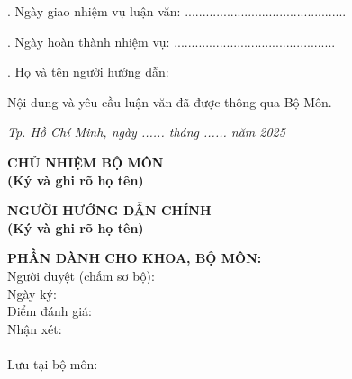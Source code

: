 \vspace{0.4cm}
. Ngày giao nhiệm vụ luận văn: .............................................. 

\vspace{0.2cm}
. Ngày hoàn thành nhiệm vụ: ..............................................

\vspace{0.2cm}
. Họ và tên người hướng dẫn: \TENCANBO

\vspace{0.4cm}
\noindent Nội dung và yêu cầu luận văn đã được thông qua Bộ Môn.

\vspace{0.3cm}
\noindent \hfill \textit{Tp. Hồ Chí Minh, ngày ...... tháng ...... năm 2025}

\vspace{0.5cm}
\begin{center}
\begin{minipage}[t]{0.48\textwidth}
\centering
\textbf{CHỦ NHIỆM BỘ MÔN} \\[2.5cm]
\textbf{\small (Ký và ghi rõ họ tên)}
\end{minipage}
\hfill
\begin{minipage}[t]{0.48\textwidth}
\centering
\textbf{NGƯỜI HƯỚNG DẪN CHÍNH} \\[2.5cm]
\textbf{\small (Ký và ghi rõ họ tên)}
\end{minipage}
\end{center}


\vspace{0.3cm}
\noindent
\begin{minipage}[t]{\textwidth}
\textbf{PHẦN DÀNH CHO KHOA, BỘ MÔN:}\\
\vspace{0.2cm}
\small
Người duyệt (chấm sơ bộ): \dotfill \\[0.2cm]
Ngày ký: \dotfill \\[0.2cm]
Điểm đánh giá: \dotfill \\[0.2cm]
Nhận xét: \dotfill \\[0.2cm]
\phantom{Nhận xét: } \dotfill \\[0.2cm]
Lưu tại bộ môn: \dotfill
\end{minipage}
